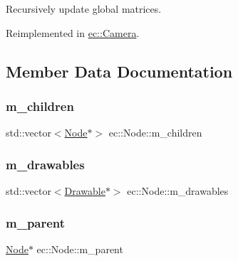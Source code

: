 Recursively update global matrices. 



Reimplemented in \mbox{\hyperlink{classec_1_1_camera_a1661dae4666cf50e697603904c96df6a}{ec\+::\+Camera}}.



\subsection{Member Data Documentation}
\mbox{\label{classec_1_1_node_a648e1758013c7fc5899cbff2f8fe41fa}} 
\subsubsection{\texorpdfstring{m\+\_\+children}{m\_children}}
{\footnotesize\ttfamily std\+::vector$<$\mbox{\hyperlink{classec_1_1_node}{Node}}$\ast$$>$ ec\+::\+Node\+::m\+\_\+children\hspace{0.3cm}{\ttfamily [protected]}}

\mbox{\label{classec_1_1_node_aa9f624971a4906674148117ba4442c01}} 
\subsubsection{\texorpdfstring{m\+\_\+drawables}{m\_drawables}}
{\footnotesize\ttfamily std\+::vector$<$\mbox{\hyperlink{classec_1_1_drawable}{Drawable}}$\ast$$>$ ec\+::\+Node\+::m\+\_\+drawables\hspace{0.3cm}{\ttfamily [protected]}}

\mbox{\label{classec_1_1_node_a9f5373bd3ba5bfed53894223adcfe791}} 
\subsubsection{\texorpdfstring{m\+\_\+parent}{m\_parent}}
{\footnotesize\ttfamily \mbox{\hyperlink{classec_1_1_node}{Node}}$\ast$ ec\+::\+Node\+::m\+\_\+parent\hspace{0.3cm}{\ttfamily [protected]}}



